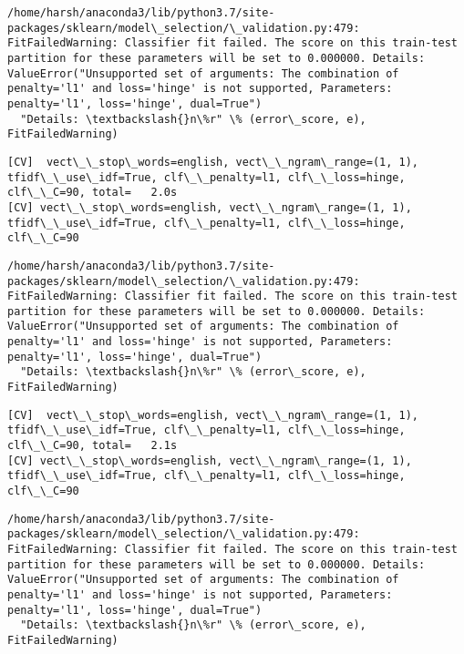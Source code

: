 \documentclass[11pt]{article}
\begin{document}
    \begin{Verbatim}[commandchars=\\\{\}]
/home/harsh/anaconda3/lib/python3.7/site-packages/sklearn/model\_selection/\_validation.py:479: FitFailedWarning: Classifier fit failed. The score on this train-test partition for these parameters will be set to 0.000000. Details: 
ValueError("Unsupported set of arguments: The combination of penalty='l1' and loss='hinge' is not supported, Parameters: penalty='l1', loss='hinge', dual=True")
  "Details: \textbackslash{}n\%r" \% (error\_score, e), FitFailedWarning)

    \end{Verbatim}

    \begin{Verbatim}[commandchars=\\\{\}]
[CV]  vect\_\_stop\_words=english, vect\_\_ngram\_range=(1, 1), tfidf\_\_use\_idf=True, clf\_\_penalty=l1, clf\_\_loss=hinge, clf\_\_C=90, total=   2.0s
[CV] vect\_\_stop\_words=english, vect\_\_ngram\_range=(1, 1), tfidf\_\_use\_idf=True, clf\_\_penalty=l1, clf\_\_loss=hinge, clf\_\_C=90 

    \end{Verbatim}

    \begin{Verbatim}[commandchars=\\\{\}]
/home/harsh/anaconda3/lib/python3.7/site-packages/sklearn/model\_selection/\_validation.py:479: FitFailedWarning: Classifier fit failed. The score on this train-test partition for these parameters will be set to 0.000000. Details: 
ValueError("Unsupported set of arguments: The combination of penalty='l1' and loss='hinge' is not supported, Parameters: penalty='l1', loss='hinge', dual=True")
  "Details: \textbackslash{}n\%r" \% (error\_score, e), FitFailedWarning)

    \end{Verbatim}

    \begin{Verbatim}[commandchars=\\\{\}]
[CV]  vect\_\_stop\_words=english, vect\_\_ngram\_range=(1, 1), tfidf\_\_use\_idf=True, clf\_\_penalty=l1, clf\_\_loss=hinge, clf\_\_C=90, total=   2.1s
[CV] vect\_\_stop\_words=english, vect\_\_ngram\_range=(1, 1), tfidf\_\_use\_idf=True, clf\_\_penalty=l1, clf\_\_loss=hinge, clf\_\_C=90 

    \end{Verbatim}

    \begin{Verbatim}[commandchars=\\\{\}]
/home/harsh/anaconda3/lib/python3.7/site-packages/sklearn/model\_selection/\_validation.py:479: FitFailedWarning: Classifier fit failed. The score on this train-test partition for these parameters will be set to 0.000000. Details: 
ValueError("Unsupported set of arguments: The combination of penalty='l1' and loss='hinge' is not supported, Parameters: penalty='l1', loss='hinge', dual=True")
  "Details: \textbackslash{}n\%r" \% (error\_score, e), FitFailedWarning)

    \end{Verbatim}
\end{document}
